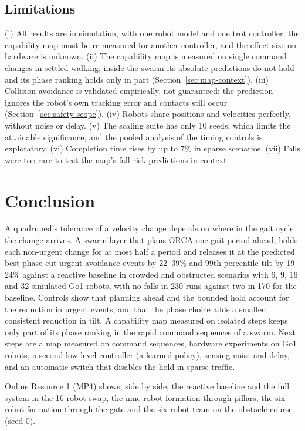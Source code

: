 \documentclass[pdflatex,sn-mathphys-num]{sn-jnl}
\begin{document}
\subsection{Limitations}
(i) All results are in simulation, with one robot model and one trot controller; the capability map must be
re-measured for another controller, and the effect size on hardware is unknown. (ii) The capability map is
measured on single command changes in settled walking; inside the swarm its absolute predictions do not hold
and its phase ranking holds only in part (Section~\ref{sec:map-context}). (iii) Collision avoidance is
validated empirically, not guaranteed: the prediction ignores the robot's own tracking error and contacts
still occur (Section~\ref{sec:safety-scope}). (iv) Robots share positions and velocities perfectly, without
noise or delay. (v) The scaling suite has only 10 seeds, which limits the attainable significance, and the
pooled analysis of the timing controls is exploratory. (vi) Completion time rises by up to 7\% in sparse
scenarios. (vii) Falls were too rare to test the map's fall-risk predictions in context.

\section{Conclusion}\label{sec:conclusion}

A quadruped's tolerance of a velocity change depends on where in the gait cycle the change arrives. A swarm
layer that plans ORCA one gait period ahead, holds each non-urgent change for at most half a period and
releases it at the predicted best phase cut urgent avoidance events by 22--39\% and 99th-percentile tilt by
19--24\% against a reactive baseline in crowded and obstructed scenarios with 6, 9, 16 and 32 simulated
Go1 robots,
with no falls in 230 runs against two in 170 for the baseline. Controls show that planning ahead and the
bounded hold account for the reduction in urgent events, and that the phase choice adds a smaller, consistent
reduction in tilt. A capability map measured on isolated steps keeps only part of its phase ranking in the rapid
command sequences of a swarm. Next steps are a map measured on command sequences, hardware experiments on Go1
robots, a second low-level controller (a learned policy), sensing noise and delay, and an automatic switch that
disables the hold in sparse traffic.

\backmatter

Online Resource 1 (MP4) shows, side by side, the reactive baseline and the full system in the 16-robot swap,
the nine-robot formation through pillars, the six-robot formation through the gate and the six-robot team
on the obstacle course (seed 0).
\end{document}
